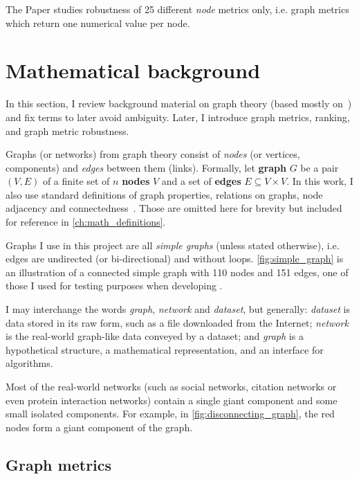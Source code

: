 The Paper studies robustness of 25 different \textsl{node} metrics only, i.e. graph metrics which return one numerical value per node.


\section{Mathematical background}\label{sec:math_background}

In this section, I review background material on graph theory (based mostly on~\cite{Estrada2017}) and fix terms to later avoid ambiguity.
Later, I introduce graph metrics, ranking, and graph metric robustness.



Graphs (or networks) from graph theory consist of \textit{nodes} (or vertices, components) and \textit{edges} between them (links).
Formally, let \textbf{graph} $G$ be a pair $(V, E)$ of a finite set of $n$ \textbf{nodes} $V$ and a set of \textbf{edges} $E \subseteq V \times V$.
In this work, I also use standard definitions of graph properties, relations on graphs, node adjacency and connectedness~\cite{Estrada2017}.
Those are omitted here for brevity but included for reference in \cref{ch:math_definitions}.

Graphs I use in this project are all \textsl{simple graphs} (unless stated otherwise), i.e. edges are undirected (or bi-directional) and without loops.
\autoref{fig:simple_graph} is an illustration of a connected simple graph with 110 nodes and 151 edges, one of those I used for testing purposes when developing \graffs.

I may interchange the words \textsl{graph}, \textsl{network} and \textsl{dataset}, but generally: \textsl{dataset} is data stored in its raw form, such as a file downloaded from the Internet; \textsl{network} is the real-world graph-like data conveyed by a dataset; and \textsl{graph} is a hypothetical structure, a mathematical representation, and an interface for algorithms.



Most of the real-world networks (such as social networks, citation networks or even protein interaction networks) contain a single giant component and some small isolated components.
For example, in \autoref{fig:disconnecting_graph}, the red nodes form a giant component of the graph.

\subsection{Graph metrics}

